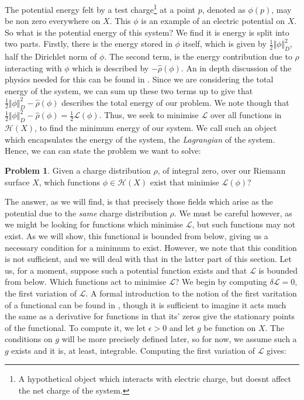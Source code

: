 \documentclass[11pt]{report}
\theoremstyle{definition}
\newtheorem*{problem}{Problem}
\begin{document}
The potential energy felt by a test charge\footnote{A hypothetical object which interacts with electric charge, but doesnt affect the net charge of the system.} at a point $p$, denoted as $\phi(p)$, may be non zero everywhere on $X$. This $\phi$ is an example of an electric potential on $X$. So what is the potential energy of this system? We find it is energy is split into two parts. Firstly, there is the energy stored in $\phi$ itself, which is given by $\frac{1}{2}\Vert \phi \Vert^2_D$, half the Dirichlet norm of $\phi$. The second term, is the energy contribution due to $\rho$ interacting with $\phi$ which is described by $-\hat{\rho}(\phi)$. An in depth discussion of the physics needed for this can be found in \cite[Chapter 1]{electromagentismBook}. Since we are considering the total energy of the system, we can sum up these two terms up to give that $\frac{1}{2}\Vert \phi \Vert^2_D - \hat{\rho}(\phi)$ describes the total energy of our problem. We note though that $\frac{1}{2}\Vert \phi \Vert^2_D - \hat{\rho}(\phi) = \frac{1}{2}\mathcal{L}(\phi)$. Thus, we seek to minimise $\mathcal{L}$ over all functions in $\mathcal{H}(X)$, to find the minimum energy of our system. We call such an object which encapsulates the energy of the system, the \emph{Lagrangian} of the system. Hence, we can can state the problem we want to solve:
\begin{problem}
  Given a charge distribution $\rho$, of integral zero, over our Riemann surface $X$, which functions $\phi \in \mathcal{H}(X)$ exist that minimise $\mathcal{L}(\phi)$?
\end{problem}
The answer, as we will find, is that precisely those fields which arise as the potential due to the \emph{same} charge distribution $\rho$. We must be careful however, as we might be looking for functions which minimise $\mathcal{L}$, but such functions may not exist. As we will show, this functional is bounded from below, giving us a necessary condition for a minimum to exist. However, we note that this condition is not sufficient, and we will deal with that in the latter part of this section. Let us, for a moment, suppose such a potential function exists and that $\mathcal{L}$ is bounded from below. Which functions act to minimise $\mathcal{L}$? We begin by computing $\delta \mathcal{L}= 0 $, the first variation of $\mathcal{L}$. A formal introduction to the notion of the first varitation of a functional can be found in \cite[p.4]{jost}, though it is sufficient to imagine it acts much the same as a derivative for functions in that its' zeros give the stationary points of the functional. To compute it, we let $\epsilon > 0$ and let $g$ be function on $X$. The conditions on $g$ will be more precisely defined later, so for now, we assume such a $g$ exists and it is, at least, integrable. Computing the first variation of $\mathcal{L}$ gives:
\end{document}
